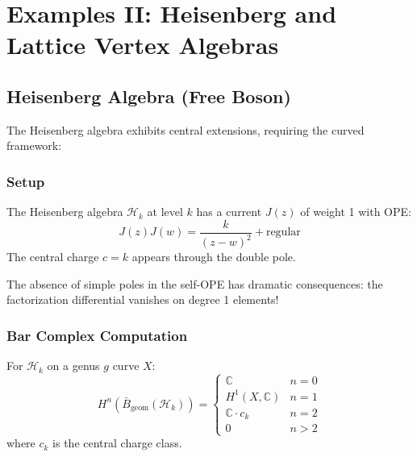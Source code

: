 \section{Examples II: Heisenberg and Lattice Vertex Algebras}
 
\subsection{Heisenberg Algebra (Free Boson)}
 
The Heisenberg algebra exhibits central extensions, requiring the curved framework:
 
\subsubsection{Setup}
 
\begin{definition}
The Heisenberg algebra $\mathcal{H}_k$ at level $k$ has a current $J(z)$ of weight 1 with OPE:
\[
J(z)J(w) = \frac{k}{(z-w)^2} + \text{regular}
\]
The central charge $c = k$ appears through the double pole.
\end{definition}
 
\begin{remark}
The absence of simple poles in the self-OPE has dramatic consequences: the factorization differential 
vanishes on degree 1 elements!
\end{remark}
 
\subsubsection{Bar Complex Computation}
 
\begin{theorem}\label{thm:heisenberg-bar}
For $\mathcal{H}_k$ on a genus $g$ curve $X$:
\[
H^n(\bar{B}_{\text{geom}}(\mathcal{H}_k)) = 
\begin{cases}
\mathbb{C} & n = 0 \\
H^1(X, \mathbb{C}) & n = 1 \\
\mathbb{C} \cdot c_k & n = 2 \\
0 & n > 2
\end{cases}
\]
where $c_k$ is the central charge class.
\end{theorem}
 

